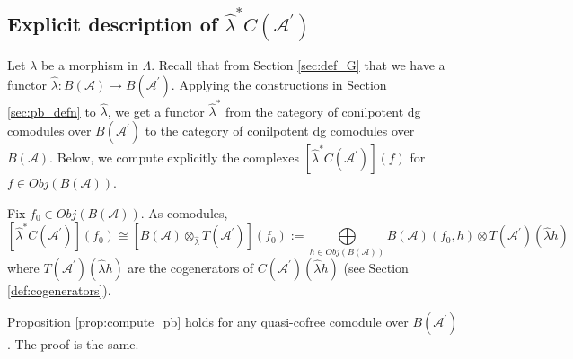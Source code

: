 \subsection{Explicit description of 
$\hat{\lambda}^*C(\mathcal{A}^\prime)$}
Let $\lambda$ be a morphism in $\Lambda$. 
Recall that from Section \ref{sec:def_G}
that we have a functor $\hat{\lambda}: 
B(\mathcal{A}) \to B(\mathcal{A}^\prime)$. 
Applying the constructions in 
Section \ref{sec:pb_defn} to
$\hat{\lambda}$, we get a functor 
$\hat{\lambda}^*$ from the 
category of conilpotent 
dg comodules over $B(\mathcal{A}^\prime)$ 
to the category 
of conilpotent dg comodules 
over $B(\mathcal{A})$. 
Below, we compute explicitly the complexes 
$[\hat{\lambda}^*C(\mathcal{A}^\prime)](f)$ 
for $f \in Obj(B(\mathcal{A}))$.
%
\begin{prop}\label{prop:compute_pb}
Fix $f_0 \in Obj(B(\mathcal{A}))$. As comodules,
\begin{equation}\label{eq:compute_pb}
[\hat{\lambda}^*C(\mathcal{A}^\prime)](f_0) \cong 
[B(\mathcal{A}) \otimes_{\hat{\lambda}} T(\mathcal{A}^\prime)](f_0) := 
\bigoplus \limits_{h \in Obj(B(\mathcal{A}))}
B(\mathcal{A})(f_0, h) \otimes T(\mathcal{A}^\prime)(\hat{\lambda} h)
\end{equation}
where $T(\mathcal{A}^\prime)(\hat{\lambda} h)$ are the cogenerators of 
$C(\mathcal{A}^\prime)(\hat{\lambda} h)$ 
(see Section \ref{def:cogenerators}).
\end{prop}
%
\begin{rem}
Proposition \ref{prop:compute_pb} holds 
for any quasi-cofree comodule over 
$B(\mathcal{A}^\prime)$. The proof is the same.
\end{rem}
%
